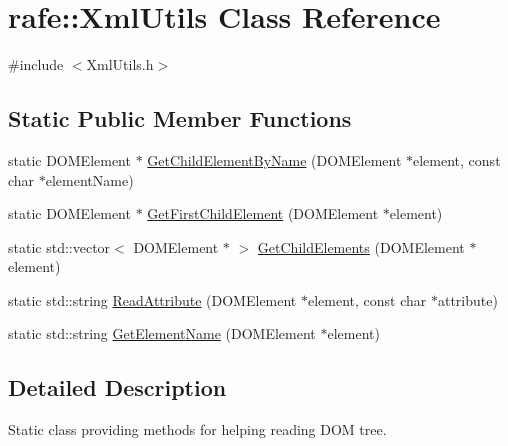 \hypertarget{classrafe_1_1_xml_utils}{\section{rafe\+:\+:Xml\+Utils Class Reference}
\label{classrafe_1_1_xml_utils}
}


{\ttfamily \#include $<$Xml\+Utils.\+h$>$}

\subsection*{Static Public Member Functions}
\begin{DoxyCompactItemize}
\item 
static D\+O\+M\+Element $\ast$ \hyperlink{classrafe_1_1_xml_utils_ae1b1eeb3eb9be629b44feeb56d9c0c41}{Get\+Child\+Element\+By\+Name} (D\+O\+M\+Element $\ast$element, const char $\ast$element\+Name)
\item 
static D\+O\+M\+Element $\ast$ \hyperlink{classrafe_1_1_xml_utils_affca10b23b38714de1cd5970d9a79095}{Get\+First\+Child\+Element} (D\+O\+M\+Element $\ast$element)
\item 
static std\+::vector$<$ D\+O\+M\+Element $\ast$ $>$ \hyperlink{classrafe_1_1_xml_utils_a34585b50c6847dd466ea6e1bc265dd23}{Get\+Child\+Elements} (D\+O\+M\+Element $\ast$element)
\item 
static std\+::string \hyperlink{classrafe_1_1_xml_utils_ada4e8422abdedf695f575c7e850ced58}{Read\+Attribute} (D\+O\+M\+Element $\ast$element, const char $\ast$attribute)
\item 
static std\+::string \hyperlink{classrafe_1_1_xml_utils_aade3e2435e54b3682d6465427cfb0acb}{Get\+Element\+Name} (D\+O\+M\+Element $\ast$element)
\end{DoxyCompactItemize}


\subsection{Detailed Description}
Static class providing methods for helping reading D\+O\+M tree. 

